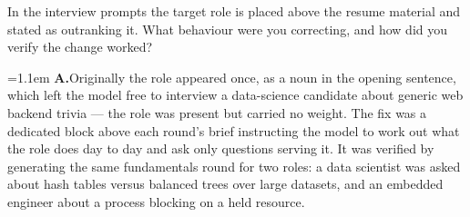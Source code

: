 \documentclass[11pt,a4paper]{article}
\newcommand{\ans}[1]{%
  \par\vspace{0.32em}%
  \begingroup
  \small\color{answerink}%
  \leftskip=1.1em
  \noindent\textbf{\color{accent}A.}\hspace{0.45em}#1\par
  \endgroup
  \vspace{0.1em}%
}
\begin{document}
\begin{questions}[resume]
\item In the interview prompts the target role is placed above the resume material
and stated as outranking it. What behaviour were you correcting, and how did you
verify the change worked?
\ans{Originally the role appeared once, as a noun in the opening sentence, which
left the model free to interview a data-science candidate about generic web
backend trivia --- the role was present but carried no weight. The fix was a
dedicated block above each round's brief instructing the model to work out what
the role does day to day and ask only questions serving it. It was verified by
generating the same fundamentals round for two roles: a data scientist was asked
about hash tables versus balanced trees over large datasets, and an embedded
engineer about a process blocking on a held resource.}

\end{questions}
\end{document}
